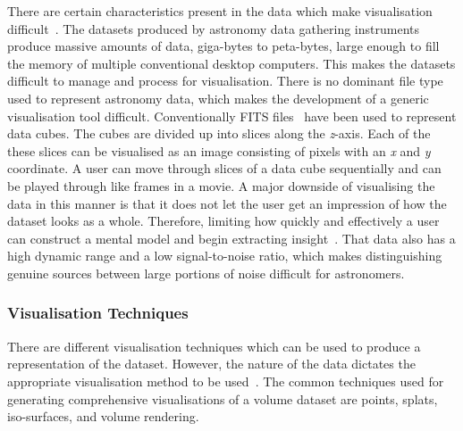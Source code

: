 
There are certain characteristics present in the data which make visualisation difficult~\cite{Hassan2011}.
The datasets produced by astronomy data gathering instruments produce massive amounts of data, giga-bytes to peta-bytes, large enough to fill the memory of multiple conventional desktop computers.
This makes the datasets difficult to manage and process for visualisation.
There is no dominant file type used to represent astronomy data, which makes the development of a generic visualisation tool difficult.
Conventionally FITS files~\cite{wells1979} have been used to represent data cubes.
The cubes are divided up into slices along the \textit{z}-axis. 
Each of the these slices can be visualised as an image consisting of pixels with an \textit{x} and \textit{y} coordinate.
A user can move through slices of a data cube sequentially and can be played through like frames in a movie.
A major downside of visualising the data in this manner is that it does not let the user get an impression of how the dataset looks as a whole.
Therefore, limiting how quickly and effectively a user can construct a mental model and begin extracting insight~\cite{Norris1994}.
That data also has a high dynamic range and a low signal-to-noise ratio, which makes distinguishing genuine sources between large portions of noise difficult for astronomers.

\subsubsection{Visualisation Techniques}
There are different visualisation techniques which can be used to produce a representation of the dataset.
However, the nature of the data dictates the appropriate visualisation method to be used~\cite{Hassan2011}.
The common techniques used for generating comprehensive visualisations of a volume dataset are points, splats, iso-surfaces, and volume rendering.

